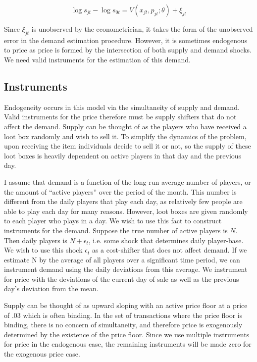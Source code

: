 \documentclass[12pt]{paper}
\begin{document}
\begin{equation*}
  \log s_{jt} - \log s_{0t} = V(x_{jt}, p_{jt}; \theta) + \xi_{jt}
\end{equation*}

Since $\xi_{jt}$ is unobserved by the econometrician, it takes the form
of the unobserved error in the demand estimation procedure. However,
it is sometimes endogenous to price as price is formed by the
intersection of both supply and demand shocks. We need valid
instruments for the estimation of this demand.

\subsection{Instruments}

Endogeneity occurs in this model via the simultaneity of supply and
demand. Valid instruments for the price therefore must be supply
shifters that do not affect the demand. Supply can be thought of as
the players who have received a loot box randomly and wish to sell
it. To simplify the dynamics of the problem, upon receiving the item
individuals decide to sell it or not, so the supply of these loot boxes
is heavily dependent on active players in that day and the previous
day. 

I assume that demand is a function of the long-run average number
of players, or the amount of ``active players'' over the period of the
month. This number is different from the daily players that play each
day, as relatively few people are able to play each day for many
reasons. However, loot boxes are given randomly to each player who
plays in a day. We wish to use this fact to construct instruments for
the demand. Suppose the true number of active players is $N$. Then daily
players is $N + \epsilon_t$, i.e. some shock that determines daily
player-base. We wish to use this shock $\epsilon_t$ as a cost-shifter that
does not affect demand. If we estimate N by the average of all players
over a significant time period, we can instrument demand using the
daily deviations from this average. We instrument for price with the
deviations of the current day of sale as well as the previous day's
deviation from the mean.


Supply can be thought of as upward sloping with an active price floor
at a price of $.03$ which is often binding. In the set of transactions
where the price floor is binding, there is no concern of simultaneity,
and therefore price is exogenously determined by the existence of the
price floor. Since we use multiple instruments for price in the
endogenous case, the remaining instruments will be made zero for the
exogenous price case. 
\end{document}
